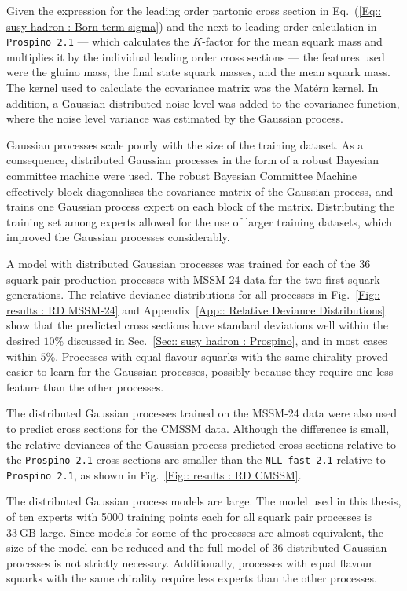 \documentclass[twoside,english]{uiofysmaster}
\begin{document}
{{Given the expression for the leading order partonic cross section in Eq.~(\ref{Eq:: susy hadron : Born term sigma}) and the next-to-leading order calculation in \verb|Prospino 2.1| --- which calculates the $K$-factor for the mean squark mass and multiplies it by the individual leading order cross sections --- the features used were the gluino mass, the final state squark masses, and the mean squark mass. The kernel used to calculate the covariance matrix was the Mat\'{e}rn kernel. In addition, a Gaussian distributed noise level was added to the covariance function, where the noise level variance was estimated by the Gaussian process.

Gaussian processes scale poorly with the size of the training dataset. As a consequence, distributed Gaussian processes in the form of a robust Bayesian committee machine were used. The robust Bayesian Committee Machine effectively block diagonalises the covariance matrix of the Gaussian process, and trains one Gaussian process expert on each block of the matrix. Distributing the training set among experts allowed for the use of larger training datasets, which improved the Gaussian processes considerably. 

A model with distributed Gaussian processes was trained for each of the 36 squark pair production processes with MSSM-24 data for the two first squark generations. The relative deviance distributions for all processes in Fig.~\ref{Fig:: results : RD MSSM-24} and Appendix~\ref{App:: Relative Deviance Distributions} show that the predicted cross sections have standard deviations well within the desired $10\%$ discussed in Sec.~\ref{Sec:: susy hadron : Prospino}, and in most cases within $5\%$. Processes with equal flavour squarks with the same chirality proved easier to learn for the Gaussian processes, possibly because they require one less feature than the other processes. 

The distributed Gaussian processes trained on the MSSM-24 data were also used to predict cross sections for the CMSSM data. Although the difference is small, the relative deviances of the Gaussian process predicted cross sections relative to the \verb|Prospino 2.1| cross sections are smaller than the \verb|NLL-fast 2.1| relative to \verb|Prospino 2.1|, as shown in Fig.~\ref{Fig:: results : RD CMSSM}.

The distributed Gaussian process models are large. The model used in this thesis, of ten experts with 5000 training points each for all squark pair processes is $33~\text{GB}$ large. Since models for some of the processes are almost equivalent, the size of the model can be reduced and the full model of 36 distributed Gaussian processes is not strictly necessary. Additionally, processes with equal flavour squarks with the same chirality require less experts than the other processes. 

}}
\end{document}
